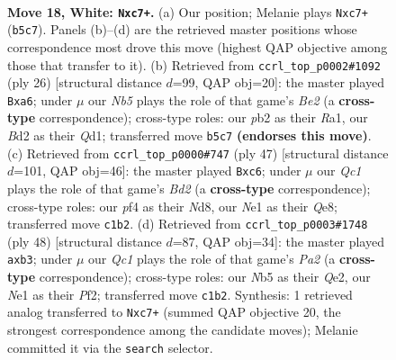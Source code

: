 \documentclass[11pt]{article}
\begin{document}
\clearpage

\begin{figure}[p]\centering
\begin{subfigure}{0.46\textwidth}\centering
\resizebox{\linewidth}{!}{%
\newchessgame
\chessboard[
  setfen={r1b1kb1r/1pp5/1nn5/1N4pp/5p1q/3P1P2/Pp1BP1B1/R1Q1NRK1 w kq - 0 18},
  showmover=false,
  pgfstyle=straightmove, color=movearrow, markmove={b5-c7}
]}
\caption{}
\end{subfigure}\hfill
\begin{subfigure}{0.46\textwidth}\centering
\resizebox{\linewidth}{!}{%
\newchessgame
\chessboard[
  setfen={r1bqr1k1/pp3pbp/n5p1/3p4/3NP3/4BP2/PP2B1PP/R2QR1K1 w - - 0 14},
  showmover=false,
  pgfstyle=straightmove, color=movearrow, markmove={e2-a6}
]}
\caption{}
\end{subfigure}
\\[4pt]
\begin{subfigure}{0.46\textwidth}\centering
\resizebox{\linewidth}{!}{%
\newchessgame
\chessboard[
  setfen={3nqr1k/1r1bb1p1/2Pp1n1p/1p2p3/1P6/2P2N1P/Q4PP1/R1BBRNK1 b - - 0 24},
  showmover=false,
  pgfstyle=straightmove, color=movearrow, markmove={d7-c6}
]}
\caption{}
\end{subfigure}\hfill
\begin{subfigure}{0.46\textwidth}\centering
\resizebox{\linewidth}{!}{%
\newchessgame
\chessboard[
  setfen={r2rb1k1/1pq2pp1/3bpn1p/4N3/2PB4/1p1B3P/P1R1QPP1/3R2K1 w - - 0 25},
  showmover=false,
  pgfstyle=straightmove, color=movearrow, markmove={a2-b3}
]}
\caption{}
\end{subfigure}
\caption{\textbf{Move 18, White: \texttt{Nxc7+}.} (a) Our position; Melanie plays \texttt{Nxc7+} (\texttt{b5c7}). Panels (b)--(d) are the retrieved master positions whose correspondence most drove this move (highest QAP objective among those that transfer to it). (b) Retrieved from \texttt{ccrl\_top\_p0002\#1092} (ply 26) [structural distance $d$=99, QAP obj=20]: the master played \texttt{Bxa6}; under $\mu$ our \emph{Nb5} plays the role of that game's \emph{Be2} (a \textbf{cross-type} correspondence); cross-type roles: our \emph{p}b2 as their \emph{R}a1, our \emph{B}d2 as their \emph{Q}d1; transferred move \texttt{b5c7} \textbf{(endorses this move)}. (c) Retrieved from \texttt{ccrl\_top\_p0000\#747} (ply 47) [structural distance $d$=101, QAP obj=46]: the master played \texttt{Bxc6}; under $\mu$ our \emph{Qc1} plays the role of that game's \emph{Bd2} (a \textbf{cross-type} correspondence); cross-type roles: our \emph{p}f4 as their \emph{N}d8, our \emph{N}e1 as their \emph{Q}e8; transferred move \texttt{c1b2}. (d) Retrieved from \texttt{ccrl\_top\_p0003\#1748} (ply 48) [structural distance $d$=87, QAP obj=34]: the master played \texttt{axb3}; under $\mu$ our \emph{Qc1} plays the role of that game's \emph{Pa2} (a \textbf{cross-type} correspondence); cross-type roles: our \emph{N}b5 as their \emph{Q}e2, our \emph{N}e1 as their \emph{P}f2; transferred move \texttt{c1b2}. Synthesis: 1 retrieved analog transferred to \texttt{Nxc7+} (summed QAP objective 20, the strongest correspondence among the candidate moves); Melanie committed it via the \texttt{search} selector.}
\label{fig:thought-m34}
\end{figure}
\end{document}
